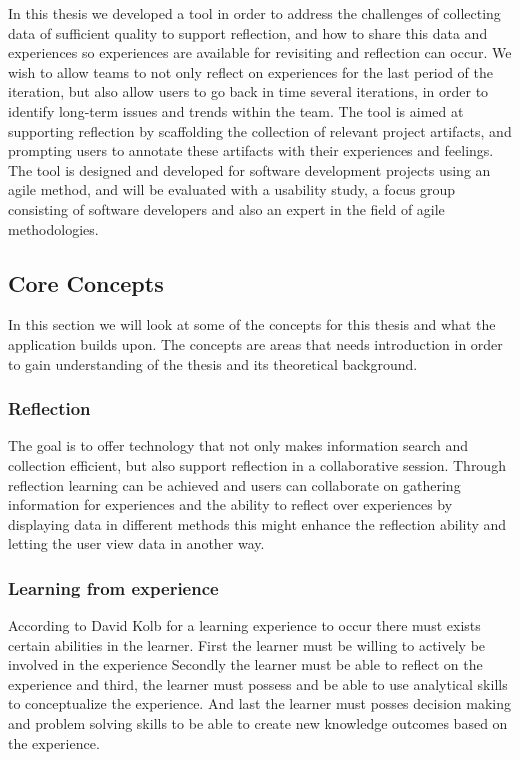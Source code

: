In this thesis we developed a tool in order to address the challenges of collecting data of sufficient quality to support reflection, and how to share this data and experiences so experiences are available for revisiting and reflection can occur. We wish to allow teams to not only reflect on experiences for the last period of the iteration, but also allow users to go back in time several iterations, in order to identify long-term issues and trends within the team. The tool is aimed at supporting reflection by scaffolding the collection of relevant project artifacts, and prompting users to annotate these artifacts with their experiences and feelings. The tool is designed and developed for software development projects using an agile method, and will be evaluated with a usability study, a focus group consisting of software developers and also an expert in the field of agile methodologies. 

\subsection{Core Concepts}
In this section we will look at some of the concepts for this thesis and what the application builds upon. The concepts are areas that needs introduction in order to gain understanding of the thesis and its theoretical background.

\subsubsection{Reflection}
The goal is to offer technology that not only makes information search and collection efficient, but also support reflection in a collaborative session. Through reflection learning can be achieved and users can collaborate on gathering information for experiences and the ability to reflect over experiences by displaying data in different methods this might enhance the reflection ability and letting the user view data in another way.

\subsubsection{Learning from experience}
According to David Kolb\citep{KolbModel} for a learning experience to occur there must exists certain abilities in the learner. First the learner must be willing to actively be involved in the experience Secondly the learner must be able to reflect on the experience and third, the learner must possess and be able to use analytical skills to conceptualize the experience. And last the learner must posses decision making and problem solving skills to be able to create new knowledge outcomes based on the experience.

